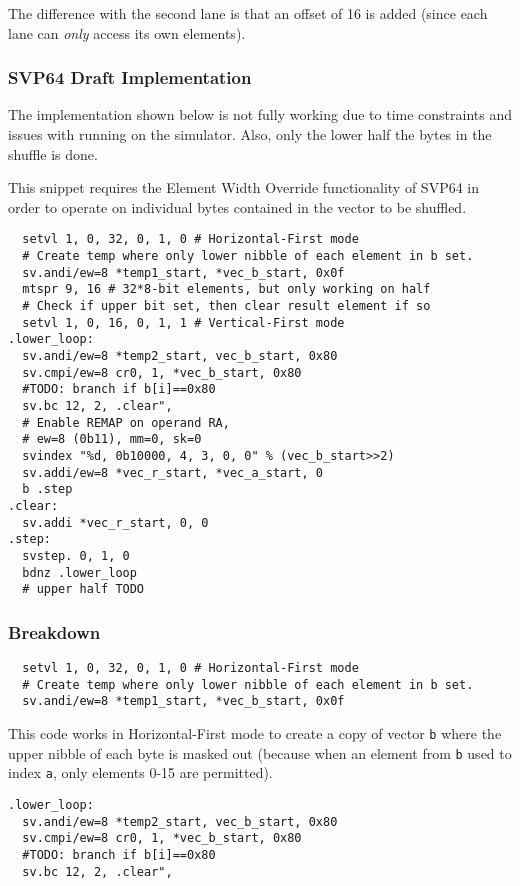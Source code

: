 The difference with the second lane is that an offset of 16 is added (since
each lane can \textit{only} access its own elements).

\subsubsection{\acrshort{SVP64} Draft Implementation}

The implementation shown below is not fully working due to time constraints
and issues with running on the simulator.
Also, only the lower half the bytes in the shuffle is done.

This snippet requires the Element Width Override functionality of
\acrshort{SVP64} in order to operate on individual bytes contained
in the vector to be shuffled.

\begin{verbatim}
  setvl 1, 0, 32, 0, 1, 0 # Horizontal-First mode
  # Create temp where only lower nibble of each element in b set.
  sv.andi/ew=8 *temp1_start, *vec_b_start, 0x0f
  mtspr 9, 16 # 32*8-bit elements, but only working on half
  # Check if upper bit set, then clear result element if so
  setvl 1, 0, 16, 0, 1, 1 # Vertical-First mode
.lower_loop:
  sv.andi/ew=8 *temp2_start, vec_b_start, 0x80
  sv.cmpi/ew=8 cr0, 1, *vec_b_start, 0x80
  #TODO: branch if b[i]==0x80
  sv.bc 12, 2, .clear",
  # Enable REMAP on operand RA,
  # ew=8 (0b11), mm=0, sk=0
  svindex "%d, 0b10000, 4, 3, 0, 0" % (vec_b_start>>2)
  sv.addi/ew=8 *vec_r_start, *vec_a_start, 0
  b .step
.clear:
  sv.addi *vec_r_start, 0, 0
.step:
  svstep. 0, 1, 0
  bdnz .lower_loop
  # upper half TODO
\end{verbatim}

\subsubsection{Breakdown}

\begin{verbatim}
  setvl 1, 0, 32, 0, 1, 0 # Horizontal-First mode
  # Create temp where only lower nibble of each element in b set.
  sv.andi/ew=8 *temp1_start, *vec_b_start, 0x0f
\end{verbatim}

This code works in Horizontal-First mode to create a copy of vector \texttt{b}
where the upper nibble of each byte is masked out (because when an element
from \texttt{b} used to index \texttt{a}, only elements 0-15 are permitted).

\begin{verbatim}
.lower_loop:
  sv.andi/ew=8 *temp2_start, vec_b_start, 0x80
  sv.cmpi/ew=8 cr0, 1, *vec_b_start, 0x80
  #TODO: branch if b[i]==0x80
  sv.bc 12, 2, .clear",
\end{verbatim}

